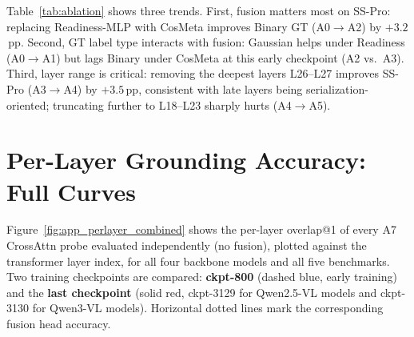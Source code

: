 \begin{table}[!htbp]
\centering
\caption{Ablation on UI-TARS-1.5-7B (overlap@1, \%, checkpoint-800, fast LoRA-probe variant).}
\label{tab:ablation}
\small
{}
\end{table}

Table~\ref{tab:ablation} shows three trends. First, fusion matters most on SS-Pro: replacing Readiness-MLP with CosMeta improves Binary GT (A0$\to$A2) by $+3.2$\,pp. Second, GT label type interacts with fusion: Gaussian helps under Readiness (A0$\to$A1) but lags Binary under CosMeta at this early checkpoint (A2 vs.\ A3). Third, layer range is critical: removing the deepest layers L26--L27 improves SS-Pro (A3$\to$A4) by $+3.5$\,pp, consistent with late layers being serialization-oriented; truncating further to L18--L23 sharply hurts (A4$\to$A5).
\section{Per-Layer Grounding Accuracy: Full Curves}
\label{app:perlayer_curves}

Figure~\ref{fig:app_perlayer_combined} shows the per-layer overlap@1 of every A7 CrossAttn probe evaluated independently (no fusion), plotted against the transformer layer index, for all four backbone models and all five benchmarks.
Two training checkpoints are compared: \textbf{ckpt-800} (dashed blue, early training) and the \textbf{last checkpoint} (solid red, ckpt-3129 for Qwen2.5-VL models and ckpt-3130 for Qwen3-VL models).
Horizontal dotted lines mark the corresponding fusion head accuracy.


